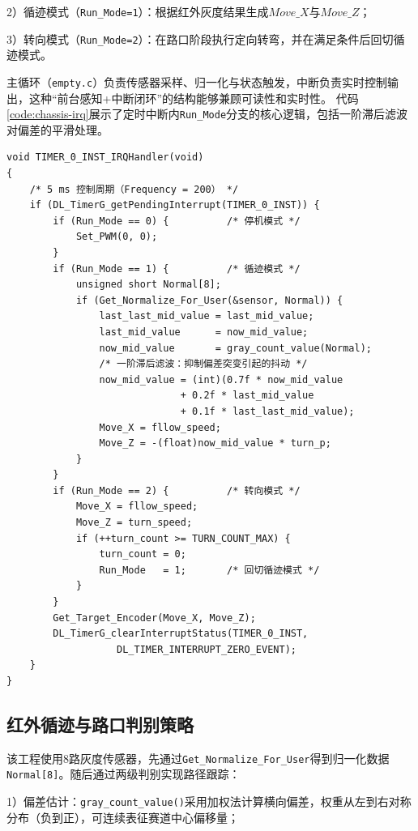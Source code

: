 2）循迹模式（\texttt{Run\_Mode=1}）：根据红外灰度结果生成\(Move\_X\)与\(Move\_Z\)；

3）转向模式（\texttt{Run\_Mode=2}）：在路口阶段执行定向转弯，并在满足条件后回切循迹模式。

主循环（\texttt{empty.c}）负责传感器采样、归一化与状态触发，中断负责实时控制输出，这种“前台感知+中断闭环”的结构能够兼顾可读性和实时性。
代码\ref{code:chassis-irq}展示了定时中断内\texttt{Run\_Mode}分支的核心逻辑，包括一阶滞后滤波对偏差的平滑处理。

\begin{lstlisting}[style=cstyle, caption={底盘定时中断控制主循环（control.c）}, label=code:chassis-irq]
void TIMER_0_INST_IRQHandler(void)
{
    /* 5 ms 控制周期（Frequency = 200） */
    if (DL_TimerG_getPendingInterrupt(TIMER_0_INST)) {
        if (Run_Mode == 0) {          /* 停机模式 */
            Set_PWM(0, 0);
        }
        if (Run_Mode == 1) {          /* 循迹模式 */
            unsigned short Normal[8];
            if (Get_Normalize_For_User(&sensor, Normal)) {
                last_last_mid_value = last_mid_value;
                last_mid_value      = now_mid_value;
                now_mid_value       = gray_count_value(Normal);
                /* 一阶滞后滤波：抑制偏差突变引起的抖动 */
                now_mid_value = (int)(0.7f * now_mid_value
                              + 0.2f * last_mid_value
                              + 0.1f * last_last_mid_value);
                Move_X = fllow_speed;
                Move_Z = -(float)now_mid_value * turn_p;
            }
        }
        if (Run_Mode == 2) {          /* 转向模式 */
            Move_X = fllow_speed;
            Move_Z = turn_speed;
            if (++turn_count >= TURN_COUNT_MAX) {
                turn_count = 0;
                Run_Mode   = 1;       /* 回切循迹模式 */
            }
        }
        Get_Target_Encoder(Move_X, Move_Z);
        DL_TimerG_clearInterruptStatus(TIMER_0_INST,
                   DL_TIMER_INTERRUPT_ZERO_EVENT);
    }
}
\end{lstlisting}
\subsection{红外循迹与路口判别策略}

该工程使用8路灰度传感器，先通过\texttt{Get\_Normalize\_For\_User}得到归一化数据\texttt{Normal[8]}。随后通过两级判别实现路径跟踪：

1）偏差估计：\texttt{gray\_count\_value()}采用加权法计算横向偏差，权重从左到右对称分布（负到正），可连续表征赛道中心偏移量；

